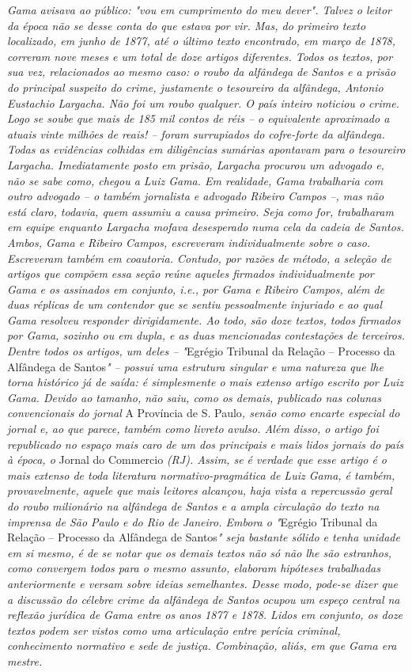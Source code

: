 \emph{Gama avisava ao público: "vou em cumprimento do meu dever". Talvez
o leitor da época não se desse conta do que estava por vir. Mas, do
primeiro texto localizado, em junho de 1877, até o último texto
encontrado, em março de 1878, correram nove meses e um total de doze
artigos diferentes. Todos os textos, por sua vez, relacionados ao mesmo
caso: o roubo da alfândega de Santos e a prisão do principal suspeito do
crime, justamente o tesoureiro da alfândega, Antonio Eustachio Largacha.
Não foi um roubo qualquer. O país inteiro noticiou o crime. Logo se
soube que mais de 185 mil contos de réis -- o equivalente aproximado a
atuais vinte milhões de reais! -- foram surrupiados do cofre-forte da
alfândega. Todas as evidências colhidas em diligências sumárias
apontavam para o tesoureiro Largacha. Imediatamente posto em prisão,
Largacha procurou um advogado e, não se sabe como, chegou a Luiz Gama.
Em realidade, Gama trabalharia com outro advogado -- o também jornalista
e advogado Ribeiro Campos --, mas não está claro, todavia, quem assumiu
a causa primeiro. Seja como for, trabalharam em equipe enquanto Largacha
mofava desesperado numa cela da cadeia de Santos. Ambos, Gama e Ribeiro
Campos, escreveram individualmente sobre o caso. Escreveram também em
coautoria. Contudo, por razões de método, a seleção de artigos que
compõem essa seção reúne aqueles firmados individualmente por Gama e os
assinados em conjunto, i.e., por Gama e Ribeiro Campos, além de duas
réplicas de um contendor que se sentiu pessoalmente injuriado e ao qual
Gama resolveu responder dirigidamente. Ao todo, são doze textos, todos
firmados por Gama, sozinho ou em dupla, e as duas mencionadas
contestações de terceiros. Dentre todos os artigos, um deles --
"}Egrégio Tribunal da Relação -- Processo da Alfândega de Santos\emph{"
-- possui uma estrutura singular e uma natureza que lhe torna histórico
já de saída: é simplesmente o mais extenso artigo escrito por Luiz Gama.
Devido ao tamanho, não saiu, como os demais, publicado nas colunas
convencionais do jornal} A Província de S. Paulo\emph{, senão como
encarte especial do jornal e, ao que parece, também como livreto avulso.
Além disso, o artigo foi republicado no espaço mais caro de um dos
principais e mais lidos jornais do país à época, o} Jornal do Commercio
\emph{(RJ). Assim, se é verdade que esse artigo é o mais extenso de toda
literatura normativo-pragmática de Luiz Gama, é também, provavelmente,
aquele que mais leitores alcançou, haja vista a repercussão geral do
roubo milionário na alfândega de Santos e a ampla circulação do texto na
imprensa de São Paulo e do Rio de Janeiro. Embora o "}Egrégio Tribunal
da Relação -- Processo da Alfândega de Santos\emph{" seja bastante
sólido e tenha unidade em si mesmo, é de se notar que os demais textos
não só não lhe são estranhos, como convergem todos para o mesmo assunto,
elaboram hipóteses trabalhadas anteriormente e versam sobre ideias
semelhantes. Desse modo, pode-se dizer que a discussão do célebre crime
da alfândega de Santos ocupou um espeço central na reflexão jurídica de
Gama entre os anos 1877 e 1878. Lidos em conjunto, os doze textos podem
ser vistos como uma articulação entre perícia criminal, conhecimento
normativo e sede de justiça. Combinação, aliás, em que Gama era mestre.}

